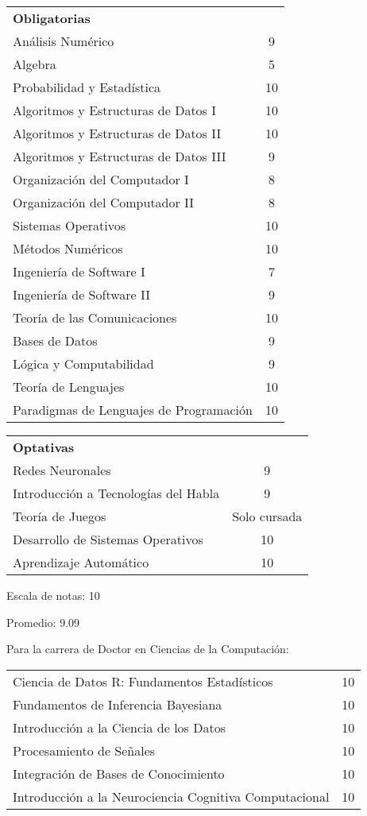 \documentclass[a4paper,10pt]{article}
\begin{document}
\begin{tabular}{ l c }

\textbf{Obligatorias} \smallskip  & \\ 
Análisis Numérico & 9\\
Algebra & 5\\
Probabilidad y Estadística & 10\\
Algoritmos y Estructuras de Datos I & 10\\
Algoritmos y Estructuras de Datos II & 10\\
Algoritmos y Estructuras de Datos III & 9\\
Organización del Computador I & 8\\
Organización del Computador II & 8\\
Sistemas Operativos & 10\\
Métodos Numéricos & 10\\
Ingeniería de Software I & 7\\
Ingeniería de Software II & 9\\
Teoría de las Comunicaciones & 10\\
Bases de Datos & 9\\
Lógica y Computabilidad & 9\\
Teoría de Lenguajes & 10\\
Paradigmas de Lenguajes de Programación & 10\\
\end{tabular}

\medskip
\begin{tabular}{l c}
\textbf{Optativas} \smallskip & \\
Redes Neuronales & 9\\
Introducción a Tecnologías del Habla & 9\\
Teoría de Juegos & Solo cursada\\
Desarrollo de Sistemas Operativos & 10\\
Aprendizaje Automático & 10\\
\end{tabular}
\bigskip

Escala de notas: 10

Promedio: 9.09

\bigskip

Para la carrera de Doctor en Ciencias de la Computación:

\medskip
\begin{tabular}{l c}
Ciencia de Datos R: Fundamentos Estadísticos & 10 \\
Fundamentos de Inferencia Bayesiana & 10 \\
Introducción a la Ciencia de los Datos & 10 \\ 
Procesamiento de Señales & 10 \\
Integración de Bases de Conocimiento & 10 \\
Introducción a la Neurociencia Cognitiva Computacional & 10 \\
\end{tabular}
\end{document}
